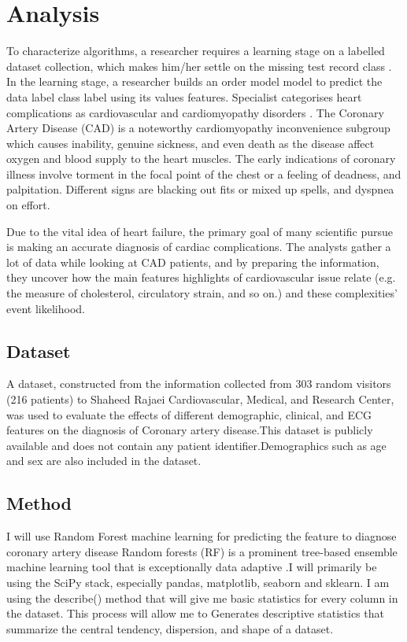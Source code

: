 \documentclass[sigconf]{acmart}
\begin{document}
\section{Analysis}
To characterize algorithms, a researcher requires a learning stage on a labelled dataset collection, which makes him/her settle on the missing test record class \cite{ali}. In the learning stage, a researcher builds an order model model to predict the data label class label using its values features. Specialist categorises heart complications as cardiovascular and cardiomyopathy disorders \cite{ali}. The Coronary Artery Disease (CAD) is a noteworthy cardiomyopathy inconvenience subgroup which causes inability, genuine sickness, and even death as the disease affect oxygen and blood supply to the heart muscles. The early indications of coronary illness involve torment in the focal point of the chest or a feeling of deadness, and palpitation. Different signs are blacking out fits or mixed up spells, and dyspnea on effort.
\par  Due to the vital idea of heart failure, the primary goal of many scientific pursue is making an accurate diagnosis of cardiac complications. The analysts gather a lot of data while looking at CAD patients, and by preparing the information, they uncover how the main features highlights of cardiovascular issue relate (e.g. the measure of cholesterol, circulatory strain, and so on.) and these complexities' event likelihood.

\subsection{Dataset}
A dataset, constructed from the information collected from 303 random visitors (216  patients)  to  Shaheed Rajaei Cardiovascular, Medical, and Research  Center, was used to evaluate the effects of different demographic, clinical, and ECG features on the diagnosis of Coronary artery disease.This dataset is publicly available and does not contain any patient identifier.Demographics such as age and sex are also included in the dataset.

\subsection{Method}
I will use Random Forest machine learning for predicting the feature to diagnose coronary artery disease Random forests (RF) is a prominent tree-based ensemble machine learning tool that is exceptionally data adaptive \cite{breiman2001random}.I will primarily be using the SciPy stack, especially pandas, matplotlib, seaborn and sklearn.
I am using the describe() method that will give me basic statistics for every column in the dataset. This process will allow me to Generates descriptive statistics that summarize the central tendency, dispersion, and shape of a dataset.
\end{document}

